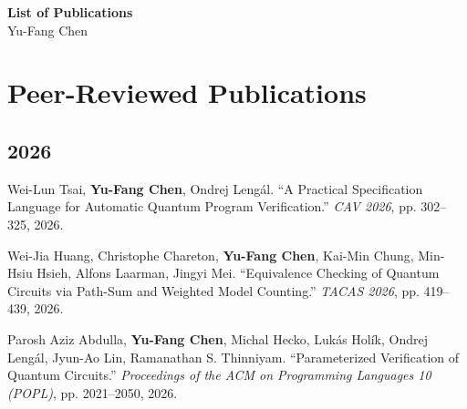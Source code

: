 \documentclass[10.5pt]{article}
\begin{document}
\begin{center}
{\Large\bfseries List of Publications}\\[3pt]
{\large Yu-Fang Chen}
\end{center}
\vspace{0.4em}
\section*{Peer-Reviewed Publications}
\subsection*{2026}
\begin{enumerate}[leftmargin=*,label={[\arabic*]},resume]
\item Wei-Lun Tsai, \textbf{Yu-Fang Chen}, Ondrej Lengál. ``A Practical Specification Language for Automatic Quantum Program Verification.'' \emph{CAV 2026}, pp. 302--325, 2026.
\item Wei-Jia Huang, Christophe Chareton, \textbf{Yu-Fang Chen}, Kai-Min Chung, Min-Hsiu Hsieh, Alfons Laarman, Jingyi Mei. ``Equivalence Checking of Quantum Circuits via Path-Sum and Weighted Model Counting.'' \emph{TACAS 2026}, pp. 419--439, 2026.
\item Parosh Aziz Abdulla, \textbf{Yu-Fang Chen}, Michal Hecko, Lukás Holík, Ondrej Lengál, Jyun-Ao Lin, Ramanathan S. Thinniyam. ``Parameterized Verification of Quantum Circuits.'' \emph{Proceedings of the ACM on Programming Languages 10 (POPL)}, pp. 2021--2050, 2026.
\end{enumerate}
\end{document}
